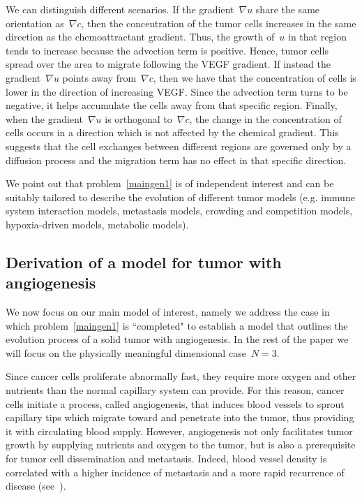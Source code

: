 \documentclass[12pt,a4paper,intlimits,sumlimits]{amsart}
\theoremstyle{definition}
\theoremstyle{plain}
\numberwithin{equation}{section}
\begin{document}
We can distinguish different scenarios. If the gradient~$\nabla u$ share the same orientation as~$\nabla c$, then the concentration of the tumor cells increases in the same direction as the chemoattractant gradient.  Thus, the growth of~$u$ in that region tends to increase
because the advection term is positive. Hence, tumor cells spread over the area to migrate following the VEGF gradient.
If instead the gradient~$\nabla u$ points away from~$\nabla c$, then we have that the concentration of cells is lower in the direction of increasing VEGF.
Since the advection term turns to be negative, it helps accumulate the cells away from that specific region. Finally, when the gradient~$\nabla u$ is orthogonal to~$\nabla c$,  the change in the concentration of cells occurs in a direction which is not affected by the chemical gradient. This suggests that the cell exchanges between different regions are governed only by a diffusion process and the migration term has no effect in that specific direction.

We point out that problem~\eqref{maingen1} is of independent interest and can be suitably tailored to describe the evolution of different tumor models (e.g. immune system interaction models, metastasis models, crowding and competition models, hypoxia-driven models, metabolic models).

\subsection{Derivation of a model for tumor with angiogenesis}
We now focus on our main model of interest, namely we address the case in which problem~\eqref{maingen1} is ``completed" to establish a model that outlines the evolution process of a solid tumor with angiogenesis. In the rest of the paper we will focus on the physically meaningful dimensional case~$N=3$.

Since cancer cells proliferate abnormally fast, they require more oxygen and
other nutrients than the normal capillary system can provide.  For this reason, cancer cells initiate
a process, called angiogenesis, that induces blood vessels to sprout capillary tips which migrate toward and penetrate into the tumor, thus providing it with circulating blood supply.
However, angiogenesis not only facilitates tumor growth by supplying nutrients and oxygen to the tumor, but is also a prerequisite for tumor cell dissemination and metastasis.  Indeed, blood vessel density is correlated with a higher incidence of metastasis and a more rapid recurrence of disease (see~\cite{PMC4030706}).
\end{document}
